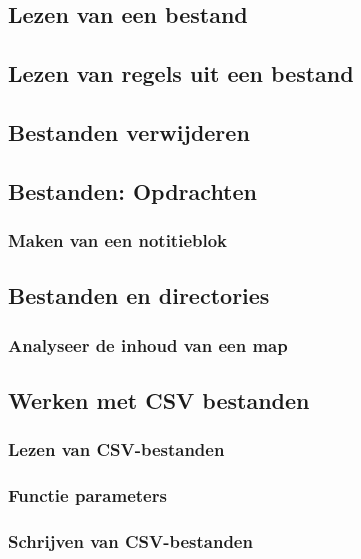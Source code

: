\documentclass[a4paper,12pt,twoside,titlepage]{article}
\begin{document}
\subsection{Lezen van een bestand}

\subsection{Lezen van regels uit een bestand}

\subsection{Bestanden verwijderen}


\subsection{Bestanden: Opdrachten}
\subsubsection{Maken van een notitieblok}


\subsection{Bestanden en directories}

\subsubsection{Analyseer de inhoud van een map}


\subsection{Werken met CSV bestanden}

\subsubsection{Lezen van CSV-bestanden}

\subsubsection{Functie parameters}

\subsubsection{Schrijven van CSV-bestanden}

\end{document}
